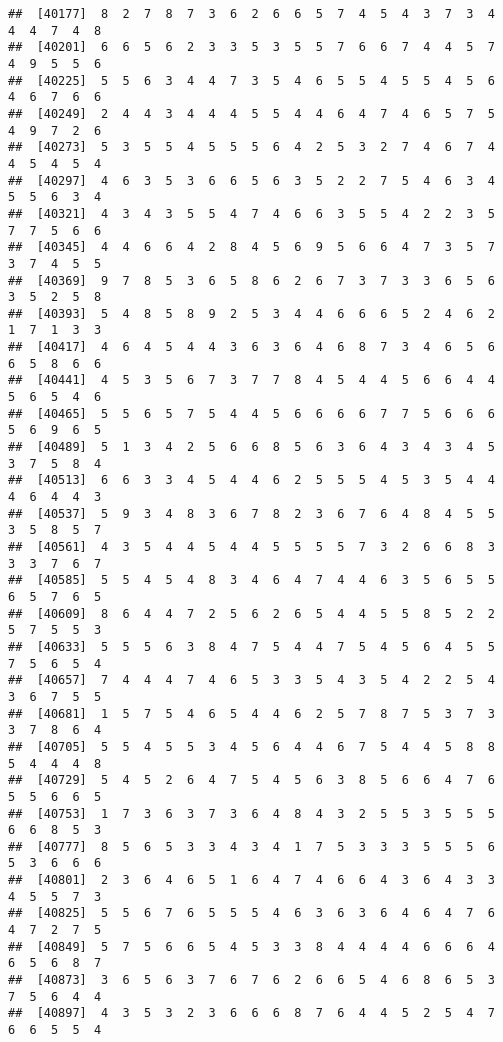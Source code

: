 \documentclass[
]{book}
\begin{document}
\begin{verbatim}
##  [40177]  8  2  7  8  7  3  6  2  6  6  5  7  4  5  4  3  7  3  4  4  4  7  4  8
##  [40201]  6  6  5  6  2  3  3  5  3  5  5  7  6  6  7  4  4  5  7  4  9  5  5  6
##  [40225]  5  5  6  3  4  4  7  3  5  4  6  5  5  4  5  5  4  5  6  4  6  7  6  6
##  [40249]  2  4  4  3  4  4  4  5  5  4  4  6  4  7  4  6  5  7  5  4  9  7  2  6
##  [40273]  5  3  5  5  4  5  5  5  6  4  2  5  3  2  7  4  6  7  4  4  5  4  5  4
##  [40297]  4  6  3  5  3  6  6  5  6  3  5  2  2  7  5  4  6  3  4  5  5  6  3  4
##  [40321]  4  3  4  3  5  5  4  7  4  6  6  3  5  5  4  2  2  3  5  7  7  5  6  6
##  [40345]  4  4  6  6  4  2  8  4  5  6  9  5  6  6  4  7  3  5  7  3  7  4  5  5
##  [40369]  9  7  8  5  3  6  5  8  6  2  6  7  3  7  3  3  6  5  6  3  5  2  5  8
##  [40393]  5  4  8  5  8  9  2  5  3  4  4  6  6  6  5  2  4  6  2  1  7  1  3  3
##  [40417]  4  6  4  5  4  4  3  6  3  6  4  6  8  7  3  4  6  5  6  6  5  8  6  6
##  [40441]  4  5  3  5  6  7  3  7  7  8  4  5  4  4  5  6  6  4  4  5  6  5  4  6
##  [40465]  5  5  6  5  7  5  4  4  5  6  6  6  6  7  7  5  6  6  6  5  6  9  6  5
##  [40489]  5  1  3  4  2  5  6  6  8  5  6  3  6  4  3  4  3  4  5  3  7  5  8  4
##  [40513]  6  6  3  3  4  5  4  4  6  2  5  5  5  4  5  3  5  4  4  4  6  4  4  3
##  [40537]  5  9  3  4  8  3  6  7  8  2  3  6  7  6  4  8  4  5  5  3  5  8  5  7
##  [40561]  4  3  5  4  4  5  4  4  5  5  5  5  7  3  2  6  6  8  3  3  3  7  6  7
##  [40585]  5  5  4  5  4  8  3  4  6  4  7  4  4  6  3  5  6  5  5  6  5  7  6  5
##  [40609]  8  6  4  4  7  2  5  6  2  6  5  4  4  5  5  8  5  2  2  5  7  5  5  3
##  [40633]  5  5  5  6  3  8  4  7  5  4  4  7  5  4  5  6  4  5  5  7  5  6  5  4
##  [40657]  7  4  4  4  7  4  6  5  3  3  5  4  3  5  4  2  2  5  4  3  6  7  5  5
##  [40681]  1  5  7  5  4  6  5  4  4  6  2  5  7  8  7  5  3  7  3  3  7  8  6  4
##  [40705]  5  5  4  5  5  3  4  5  6  4  4  6  7  5  4  4  5  8  8  5  4  4  4  8
##  [40729]  5  4  5  2  6  4  7  5  4  5  6  3  8  5  6  6  4  7  6  5  5  6  6  5
##  [40753]  1  7  3  6  3  7  3  6  4  8  4  3  2  5  5  3  5  5  5  6  6  8  5  3
##  [40777]  8  5  6  5  3  3  4  3  4  1  7  5  3  3  3  5  5  5  6  5  3  6  6  6
##  [40801]  2  3  6  4  6  5  1  6  4  7  4  6  6  4  3  6  4  3  3  4  5  5  7  3
##  [40825]  5  5  6  7  6  5  5  5  4  6  3  6  3  6  4  6  4  7  6  4  7  2  7  5
##  [40849]  5  7  5  6  6  5  4  5  3  3  8  4  4  4  4  6  6  6  4  6  5  6  8  7
##  [40873]  3  6  5  6  3  7  6  7  6  2  6  6  5  4  6  8  6  5  3  7  5  6  4  4
##  [40897]  4  3  5  3  2  3  6  6  6  8  7  6  4  4  5  2  5  4  7  6  6  5  5  4

\end{verbatim}
\end{document}
